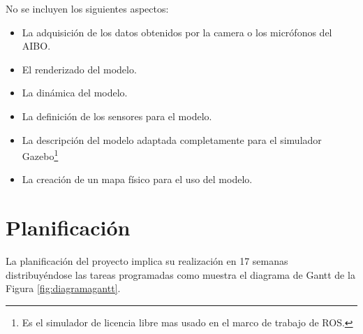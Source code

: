 \documentclass[12pt,a4paper,final,twoside]{book}
\begin{document}
No se incluyen los siguientes aspectos:
\begin{itemize}
\item La adquisición de los datos obtenidos por la camera o los micrófonos del AIBO.
\item El renderizado del modelo.
\item La dinámica del modelo.
\item La definición de los sensores para el modelo.
\item La descripción del modelo adaptada completamente para el simulador Gazebo\footnote{Es el simulador de licencia libre mas usado en el marco de trabajo de ROS.}
\item La creación de un mapa físico para el uso del modelo.
\end{itemize}

\section{Planificación}
La planificación del proyecto implica su realización en 17 semanas  distribuyéndose las tareas programadas como muestra el diagrama de Gantt de la Figura \ref{fig:diagramagantt}.
\end{document}
